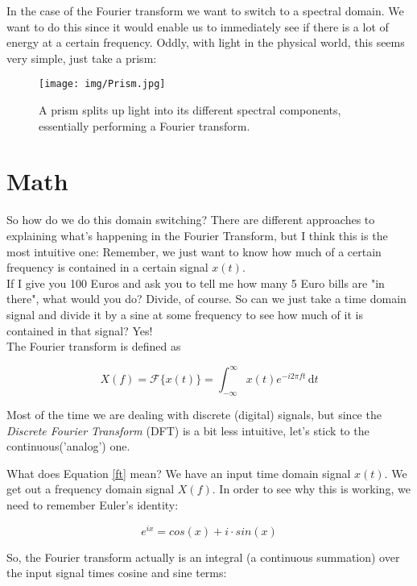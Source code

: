 In the case of the Fourier transform we want to switch to a spectral domain. We want to do this since it would enable us to immediately see if there is a lot of energy at a certain frequency. Oddly, with light in the physical world, this seems very simple, just take a prism:

\begin{figure}[H]
	\centering
	\texttt{[image: img/Prism.jpg]}
	\caption[prism]
	{A prism splits up light into its different spectral components, essentially performing a Fourier transform.}
	\label{fig:prism}
\end{figure}

\section{Math}
So how do we do this domain switching? There are different approaches to explaining what's happening in the Fourier Transform, but I think this is the most intuitive one: Remember, we just want to know how much of a certain frequency is contained in a certain signal $x(t)$.\\
If I give you 100 Euros and ask you to tell me how many 5 Euro bills are "in there", what would you do? Divide, of course. So can we just take a time domain signal and divide it by a sine at some frequency to see how much of it is contained in that signal? Yes!\\
The Fourier transform is defined as

\begin{equation}
	X(f)= \mathcal{F} \{x(t)\} = \int_{-\infty}^\infty \! x(t) e^{-i2\pi ft} \, \mathrm{d}t
	\label{ft}
\end{equation}

Most of the time we are dealing with discrete (digital) signals, but since the  \textit{Discrete Fourier Transform} (DFT) is a bit less intuitive, let's stick to the continuous('analog') one.


What does Equation \ref{ft} mean? We have an input time domain signal $x(t)$. We get out a frequency domain signal $X(f)$. In order to see why this is working, we need to remember Euler's identity:

\begin{equation}
	e ^{ix} = cos(x)+i \cdot sin(x)
\end{equation}

So, the Fourier transform actually is an integral (a continuous summation) over the input signal times cosine and sine terms:


